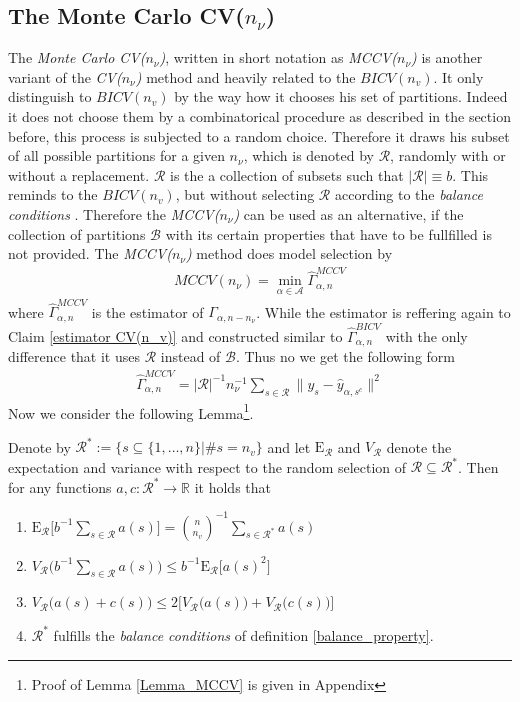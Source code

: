 \documentclass[Research_Module_ES.tex]{subfiles}
\begin{document}
\subsection{The Monte Carlo CV($n_\nu$)}

The \textit{Monte Carlo CV($n_\nu$)}, written in short notation as \textit{MCCV($n_\nu$)} is another variant of the \textit{CV($n_\nu$)} method and heavily related to the $BICV(n_v)$. It only distinguish to $BICV(n_v)$ by the way how it chooses his set of partitions. Indeed it does not choose them by a combinatorical procedure as described in the section before, this process is subjected to a random choice. Therefore it draws his subset of all possible partitions for a given $n_\nu$, which is denoted by $\mathcal{R}$, randomly with or without a replacement. $\mathcal{R}$ is the a collection of subsets such that $|\mathcal{R}|\equiv b$. This reminds to the $BICV(n_v)$, but without selecting $\mathcal{R}$ according to the \textit{balance conditions} . Therefore the \textit{MCCV($n_\nu$)} can be used as an alternative, if the collection of partitions $\mathcal{B}$ with its certain properties that have to be fullfilled is not provided. The \textit{MCCV($n_\nu$)} method does model selection by 
\begin{align*}
MCCV(n_\nu)=\min_{\alpha\in\mathcal{A}}\hat{\Gamma}_{\alpha,n}^{MCCV}
\end{align*}
where $\hat{\Gamma}_{\alpha,n}^{MCCV}$ is the estimator of $\Gamma_{\alpha,n-n_\nu}$. While the estimator is reffering again to Claim \ref{estimator CV(n_v)} and constructed similar to $\hat{\Gamma}_{\alpha,n}^{BICV}$ with the only difference that it uses $\mathcal{R}$ instead of $\mathcal{B}$. Thus no we get the following form
\begin{align*}
\hat{\Gamma}_{\alpha,n}^{MCCV}=|\mathcal{R}|^{-1}n_\nu^{-1}\sum_{s\in\mathcal{R}}\parallel y_s-\hat{y}_{\alpha,s^c}\parallel^2
\end{align*}
Now we consider the following Lemma\footnote{Proof of Lemma \ref{Lemma_MCCV} is given in Appendix }.
\begin{lemma}
	\label{Lemma_MCCV}
Denote by $\mathcal{R}^\ast:= \{s\subseteq\{1,\dots,n\}|\# s=n_v\}$ and let $\mathrm{E}_\mathcal{R}$ and $V_\mathcal{R}$ denote the expectation and variance with respect to the random selection of $\mathcal{R}\subseteq\mathcal{R}^\ast$. Then for any functions $a,c:\mathcal{R}^\ast\to \mathbb{R}$ it holds that
\begin{enumerate}
\item $\mathrm{E}_\mathcal{R} \bigl[ b^{-1}\sum_{s\in \mathcal{R}}a(s)\bigr] = \binom{n}{n_v}^{-1}\sum_{s\in\mathcal{R}^\ast}a(s)$
\item $V_\mathcal{R} \bigl( b^{-1}\sum_{s\in \mathcal{R}}a(s)\bigr) \le b^{-1} \mathrm{E}_\mathcal{R} \bigl[a(s)^2\bigr]$
\item $V_\mathcal{R}\bigl(a(s)+c(s)\bigr) \le 2\bigl[V_\mathcal{R}\bigl(a(s)\bigr)+V_\mathcal{R}\bigl(c(s)\bigr)\bigr]$
\item $\mathcal{R}^\ast$ fulfills the \textit{balance conditions} of definition \ref{balance_property}.
\end{enumerate}
\end{lemma}
\end{document}
